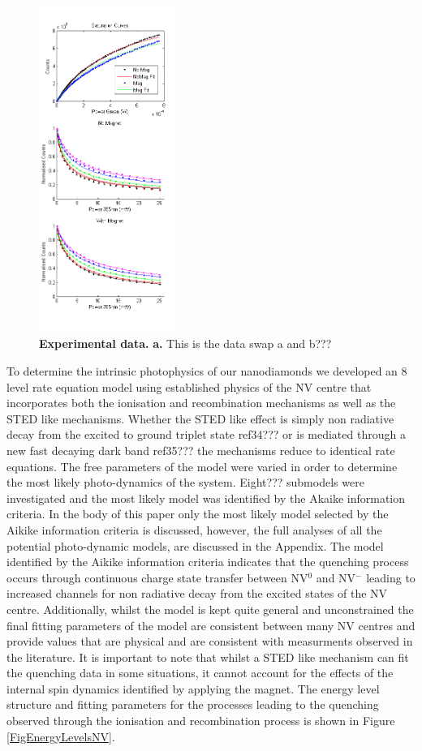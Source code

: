 \documentclass[prl]{revtex4}
\begin{document}
\begin{figure}[H]
  \centering
  \includegraphics[width=0.4\textwidth]{DataCurves.png} 
 \caption{\textbf{Experimental data.} \textbf{a.} This is the data swap a and b???} \label{FigData}
\end{figure}

To determine the intrinsic photophysics of our nanodiamonds we developed an 8 level rate equation model using established physics of the NV centre that incorporates both the ionisation and recombination mechanisms as well as the STED like mechanisms. Whether the STED like effect is simply non radiative decay from the excited to ground triplet state ref34??? or is mediated through a new fast decaying dark band ref35??? the mechanisms reduce to identical rate equations. The free parameters of the model were varied in order to determine the most likely photo-dynamics of the system. Eight??? submodels were investigated and the most likely model was identified by the Akaike information criteria. In the body of this paper only the most likely model selected by the Aikike information criteria is discussed, however, the full analyses of all the potential photo-dynamic models, are discussed in the Appendix. The model identified by the Aikike information criteria indicates that the quenching process occurs through continuous charge state transfer between NV$^0$ and NV$^-$ leading to increased channels for non radiative decay from the excited states of the NV centre. Additionally, whilst the model is kept quite general and unconstrained the final fitting parameters of the model are consistent between many NV centres and provide values that are physical and are consistent with measurments observed in the literature. It is important to note that whilst a STED like mechanism can fit the quenching data in some situations, it cannot account for the effects of the internal spin dynamics identified by applying the magnet. The energy level structure and fitting parameters for the processes leading to the quenching observed through the ionisation and recombination process is shown in Figure \ref{FigEnergyLevelsNV}.
\end{document}
